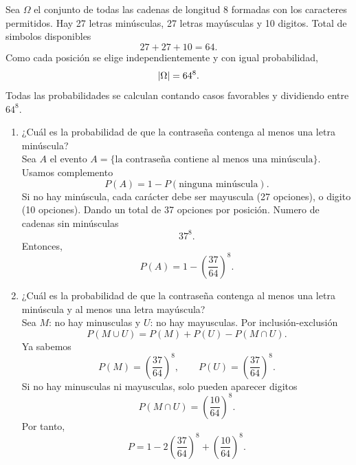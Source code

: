 \documentclass[12pt,a4paper]{article}
\begin{document}
    \begin{solucion}
        Sea $\Omega$ el conjunto de todas las cadenas de longitud 8 formadas con los caracteres
        permitidos. Hay 27 letras minúsculas, 27 letras mayúsculas y 10 digitos. Total de simbolos disponibles
        \begin{equation*}
            27+27+10=64.
        \end{equation*}
        Como cada posición se elige independientemente y con igual probabilidad,
        \begin{equation*}
            \abs{\Omega}=64^{8}.
        \end{equation*}
        Todas las probabilidades se calculan contando casos favorables y dividiendo entre $64^{8}$.
        \begin{enumerate}
            \item[(a)] ¿Cuál es la probabilidad de que la contraseña contenga al menos una letra minúscula?\\
            Sea $A$ el evento $A=\{\text{la contraseña contiene al menos una minúscula}\}$. Usamos complemento
            \begin{equation*}
                P(A)=1-P(\text{ninguna minúscula}).
            \end{equation*}
            Si no hay minúscula, cada carácter debe ser mayuscula (27 opciones), o digito (10 opciones).
            Dando un total de 37 opciones por posición. Numero de cadenas sin minúsculas
            \begin{equation*}
                37^{8}.
            \end{equation*}
            Entonces,
            \begin{equation*}
                P(A)=1-\left(\frac{37}{64}\right)^{8}.
            \end{equation*}
            \item[(b)] ¿Cuál es la probabilidad de que la contraseña contenga al menos una letra minúscula y al menos una letra mayúscula?\\
            Sea $M$: no hay minusculas y $U$: no hay mayusculas. Por inclusión-exclusión
            \begin{equation*}
                P(M\cup U)=P(M)+P(U)-P(M\cap U).
            \end{equation*}
            Ya sabemos
            \begin{equation*}
                P(M)=\left(\frac{37}{64}\right)^{8},\qquad P(U)=\left(\frac{37}{64}\right)^{8}.
            \end{equation*}
            Si no hay minusculas ni mayusculas, solo pueden aparecer digitos
            \begin{equation*}
                P(M\cap U)=\left(\frac{10}{64}\right)^{8}.
            \end{equation*}
            Por tanto,
            \begin{equation*}
                P=1-2\left(\frac{37}{64}\right)^{8}+\left(\frac{10}{64}\right)^{8}.
            \end{equation*}
        \end{enumerate}
    \end{solucion}
\end{document}

